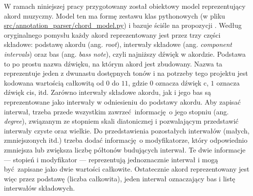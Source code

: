 W ramach niniejszej pracy przygotowany został obiektowy model reprezentujący akord muzyczny. Model ten ma formę zestawu klas pythonowych (w pliku \url{src/annotation_parser/chord_model.py}) i bazuje ściśle na propozycji \cite{harte_towards_nodate}. Według oryginalnego pomysłu każdy akord reprezentowany jest przez trzy części składowe: podstawę akordu (ang. \emph{root}), interwały składowe (ang. \emph{component intervals}) oraz bas (ang. \emph{bass note}), czyli najniższy dźwięk w akordzie. Podstawa to po prostu nazwa dźwięku, na którym akord jest zbudowany. Nazwa ta reprezentuje jeden z dwunastu dostępnych tonów i na potrzeby tego projektu jest kodowana wartością całkowitą od $0$ do $11$, gdzie $0$ oznacza dźwięk c, $1$ oznacza dźwięk cis, itd. Zarówno interwały składowe akordu, jak i jego bas są reprezentowane jako interwały w odniesieniu do podstawy akordu.  Aby zapisać interwał, trzeba przede wszystkim zawrzeć informację o jego stopniu (ang.  \emph{degree}), związanym ze stopniem skali diatonicznej i pozwalającym przedstawić interwały czyste oraz wielkie. Do przedstawienia pozostałych interwałów (małych, zmniejszonych itd.) trzeba dodać informację o modyfikatorze, który odpowiednio zmniejsza lub zwiększa liczbę półtonów budujących interwał. Te dwie informacje --- stopień i modyfikator --- reprezentują jednoznacznie interwał i mogą być zapisane jako dwie wartości całkowite. Ostatecznie akord reprezentowany jest więc przez podstawę (liczba całkowita), jeden interwał oznaczający bas i listę interwałów składowych.

